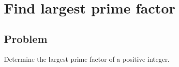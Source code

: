 
\section{Find largest prime factor}


\subsection*{Problem}

Determine the largest prime factor of a positive integer.
